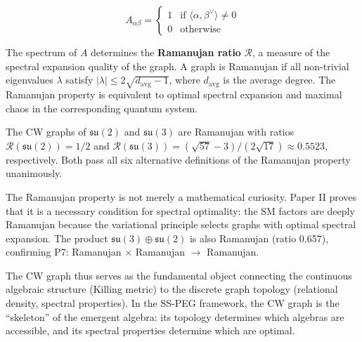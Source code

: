 \begin{equation}
A_{\alpha\beta} = \begin{cases}
1 & \text{if } \langle \alpha, \beta^\vee \rangle \neq 0 \\
0 & \text{otherwise}
\end{cases}
\end{equation}

The spectrum of $A$ determines the \textbf{Ramanujan ratio} $\mathcal{R}$, a measure of the spectral expansion quality of the graph. A graph is Ramanujan if all non-trivial eigenvalues $\lambda$ satisfy $|\lambda| \leq 2\sqrt{d_{\mathrm{avg}} - 1}$, where $d_{\mathrm{avg}}$ is the average degree. The Ramanujan property is equivalent to optimal spectral expansion and maximal chaos in the corresponding quantum system.

\begin{theorem}
The CW graphs of $\mathfrak{su}(2)$ and $\mathfrak{su}(3)$ are Ramanujan with ratios $\mathcal{R}(\mathfrak{su}(2)) = 1/2$ and $\mathcal{R}(\mathfrak{su}(3)) = (\sqrt{57} - 3)/(2\sqrt{17}) \approx 0.5523$, respectively. Both pass all six alternative definitions of the Ramanujan property unanimously.
\end{theorem}

The Ramanujan property is not merely a mathematical curiosity. Paper II proves that it is a necessary condition for spectral optimality: the SM factors are deeply Ramanujan because the variational principle selects graphs with optimal spectral expansion. The product $\mathfrak{su}(3) \oplus \mathfrak{su}(2)$ is also Ramanujan (ratio 0.657), confirming P7: Ramanujan $\times$ Ramanujan $\to$ Ramanujan.

The CW graph thus serves as the fundamental object connecting the continuous algebraic structure (Killing metric) to the discrete graph topology (relational density, spectral properties). In the SS-PEG framework, the CW graph is the ``skeleton'' of the emergent algebra: its topology determines which algebras are accessible, and its spectral properties determine which are optimal.